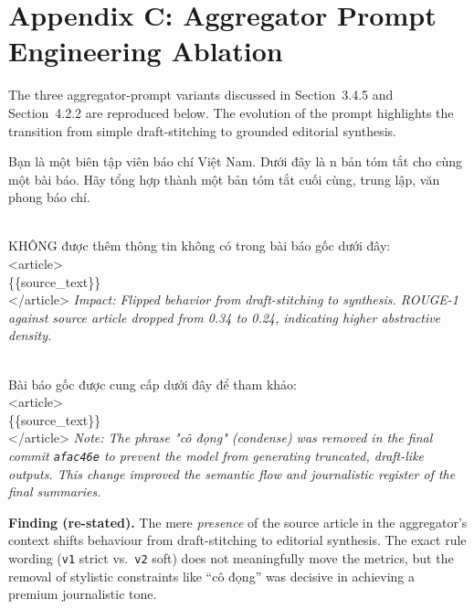 \section*{Appendix C: Aggregator Prompt Engineering Ablation}

The three aggregator-prompt variants discussed in Section~3.4.5 and
Section~4.2.2 are reproduced below. The evolution of the prompt highlights the
transition from simple draft-stitching to grounded editorial synthesis.

\begin{tcolorbox}[title=Baseline Variant (Stitching Only), colback=gray!5!white, colframe=gray!75!black, breakable, fontupper=\small\ttfamily]
Bạn là một biên tập viên báo chí Việt Nam. Dưới đây là n bản tóm tắt cho cùng một bài báo. Hãy tổng hợp thành một bản tóm tắt cuối cùng, trung lập, văn phong báo chí.
\end{tcolorbox}

\begin{tcolorbox}\\
KHÔNG được thêm thông tin không có trong bài báo gốc dưới đây:\\
<article>\\
\{\{source\_text\}\}\\
</article>
\tcblower
\textit{Impact: Flipped behavior from draft-stitching to synthesis. ROUGE-1 against source article dropped from 0.34 to 0.24, indicating higher abstractive density.}
\end{tcolorbox}

\begin{tcolorbox}\\
Bài báo gốc được cung cấp dưới đây để tham khảo:\\
<article>\\
\{\{source\_text\}\}\\
</article>
\tcblower
\textit{Note: The phrase "cô đọng" (condense) was removed in the final commit \texttt{afac46e} to prevent the model from generating truncated, draft-like outputs. This change improved the semantic flow and journalistic register of the final summaries.}
\end{tcolorbox}

\textbf{Finding (re-stated).} The mere \textit{presence} of the
source article in the aggregator's context shifts behaviour from
draft-stitching to editorial synthesis. The exact rule wording
(\texttt{v1} strict vs.\ \texttt{v2} soft) does not meaningfully move
the metrics, but the removal of stylistic constraints like ``cô đọng''
was decisive in achieving a premium journalistic tone.

